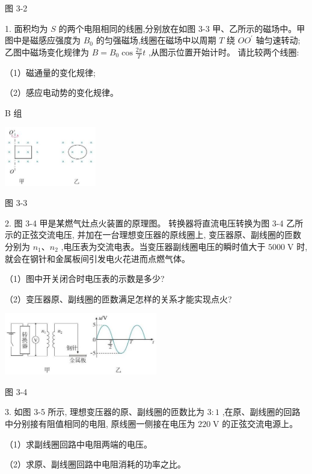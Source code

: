 \documentclass[10pt]{article}
\begin{document}
图 3-2

1. 面积均为 \(S\) 的两个电阻相同的线圈,分别放在如图 3-3 甲、乙所示的磁场中。甲图中是磁感应强度为 \({B}_{0}\) 的匀强磁场,线圈在磁场中以周期 \(T\) 绕 \(O{O}^{\prime }\) 轴匀速转动; 乙图中磁场变化规律为 \(B = {B}_{0}\cos \frac{2\pi }{T}t\) ,从图示位置开始计时。 请比较两个线圈:

（1）磁通量的变化规律;

（2）感应电动势的变化规律。

B 组

\begin{center}
\includegraphics[max width=0.3\textwidth]{images/01910e72-c5b7-7ed5-a6d4-fb3a5faefc32_73_929836.jpg}
\end{center}

图 3-3

2. 图 3-4 甲是某燃气灶点火装置的原理图。 转换器将直流电压转换为图 3-4 乙所示的正弦交流电压, 并加在一台理想变压器的原线圈上, 变压器原、副线圈的匝数分别为 \({n}_{1}\text{、}{n}_{2}\) ,电压表为交流电表。当变压器副线圈电压的瞬时值大于 \({5000}\mathrm{\;V}\) 时,就会在钢针和金属板间引发电火花进而点燃气体。

（1）图中开关闭合时电压表的示数是多少?

（2）变压器原、副线圈的匝数满足怎样的关系才能实现点火?

\begin{center}
\includegraphics[max width=0.5\textwidth]{images/01910e72-c5b7-7ed5-a6d4-fb3a5faefc32_74_718840.jpg}
\end{center}

图 3-4

3. 如图 3-5 所示, 理想变压器的原、副线圈的匝数比为 \(3 : 1\) ,在原、副线圈的回路中分别接有阻值相同的电阻, 原线圈一侧接在电压为 \({220}\mathrm{\;V}\) 的正弦交流电源上。

（1）求副线圈回路中电阻两端的电压。

（2）求原、副线圈回路中电阻消耗的功率之比。
\end{document}
